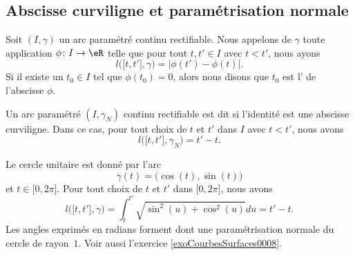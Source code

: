 \subsection{Abscisse curviligne et paramétrisation normale}     \label{SubSecAbsCurv}

\begin{definition}
    Soit $(I,\gamma)$ un arc paramétré continu rectifiable. Nous appelons  de $\gamma$ toute application $\phi\colon I\to \eR$ telle que pour tout $t,t'\in I$ avec $t<t'$, nous ayons
    \begin{equation}
        l\big( \mathopen[ t,t'  \mathclose],\gamma\big) = \big|  \phi(t')-\phi(t) \big|.
    \end{equation}
    Si il existe un $t_0\in I$ tel que $\phi(t_0)=0$, alors nous disons que $t_0$ est l' de l'abscisse $\phi$.

    Un arc paramétré $(I,\gamma_N)$ continu rectifiable est dit  si l'identité est une abscisse curviligne. Dans ce cas, pour tout choix de $t$ et $t'$ dans $I$ avec $t<t'$, nous avons 
    \begin{equation}
        l\big( \mathopen[ t , t' \mathclose],\gamma_N \big)=t'-t.
    \end{equation}
\end{definition}

%
%

\begin{example}     \label{ExCerlceRadNorm}
    Le cercle unitaire est donné par l'arc
    \begin{equation}
        \gamma(t)=\big( \cos(t),\sin(t) \big)
    \end{equation}
    et $t\in\mathopen[ 0 , 2\pi \mathclose]$. Pour tout choix de $t$ et $t'$ dans $\mathopen[ 0 , 2\pi \mathclose]$, nous avons
    \begin{equation}
        l\big( \mathopen[ t , t' \mathclose],\gamma \big)=\int_t^{t'}\sqrt{\sin^2(u)+\cos^2(u)}du=t'-t.
    \end{equation}
    Les angles exprimés en radians forment dont une paramétrisation normale du cercle de rayon~$1$. Voir aussi l'exercice \ref{exoCourbesSurfaces0008}.
\end{example}

